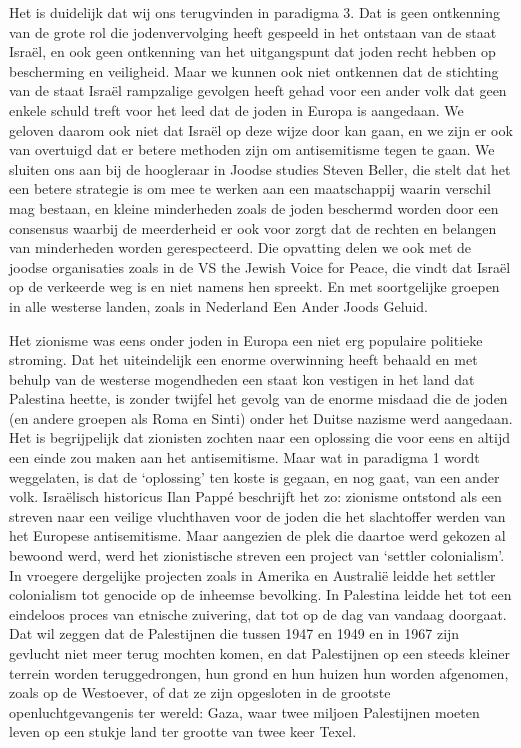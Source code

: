 Het is duidelijk dat wij ons terugvinden in paradigma 3. Dat is geen
ontkenning van de grote rol die jodenvervolging heeft gespeeld in het
ontstaan van de staat Israël, en ook geen ontkenning van het
uitgangspunt dat joden recht hebben op bescherming en veiligheid. Maar
we kunnen ook niet ontkennen dat de stichting van de staat Israël
rampzalige gevolgen heeft gehad voor een ander volk dat geen enkele
schuld treft voor het leed dat de joden in Europa is aangedaan. We
geloven daarom ook niet dat Israël op deze wijze door kan gaan, en we
zijn er ook van overtuigd dat er betere methoden zijn om antisemitisme
tegen te gaan. We sluiten ons aan bij de hoogleraar in Joodse studies
Steven Beller, die stelt dat het een betere strategie is om mee te
werken aan een maatschappij waarin verschil mag bestaan, en kleine
minderheden zoals de joden beschermd worden door een consensus waarbij
de meerderheid er ook voor zorgt dat de rechten en belangen van
minderheden worden gerespecteerd. Die opvatting delen we ook met de
joodse organisaties zoals in de VS the Jewish Voice for Peace, die vindt
dat Israël op de verkeerde weg is en niet namens hen spreekt. En met
soortgelijke groepen in alle westerse landen, zoals in Nederland Een
Ander Joods Geluid.

Het zionisme was eens onder joden in Europa een niet erg populaire
politieke stroming. Dat het uiteindelijk een enorme overwinning heeft
behaald en met behulp van de westerse mogendheden een staat kon vestigen
in het land dat Palestina heette, is zonder twijfel het gevolg van de
enorme misdaad die de joden (en andere groepen als Roma en Sinti) onder
het Duitse nazisme werd aangedaan. Het is begrijpelijk dat zionisten
zochten naar een oplossing die voor eens en altijd een einde zou maken
aan het antisemitisme. Maar wat in paradigma 1 wordt weggelaten, is dat
de `oplossing' ten koste is gegaan, en nog gaat, van een ander volk.
Israëlisch historicus Ilan Pappé beschrijft het zo: zionisme ontstond
als een streven naar een veilige vluchthaven voor de joden die het
slachtoffer werden van het Europese antisemitisme. Maar aangezien de
plek die daartoe werd gekozen al bewoond werd, werd het zionistische
streven een project van `settler colonialism'. In vroegere dergelijke
projecten zoals in Amerika en Australië leidde het settler colonialism
tot genocide op de inheemse bevolking. In Palestina leidde het tot een
eindeloos proces van etnische zuivering, dat tot op de dag van vandaag
doorgaat. Dat wil zeggen dat de Palestijnen die tussen 1947 en 1949 en
in 1967 zijn gevlucht niet meer terug mochten komen, en dat Palestijnen
op een steeds kleiner terrein worden teruggedrongen, hun grond en hun
huizen hun worden afgenomen, zoals op de Westoever, of dat ze zijn
opgesloten in de grootste openluchtgevangenis ter wereld: Gaza, waar
twee miljoen Palestijnen moeten leven op een stukje land ter grootte van
twee keer Texel.


